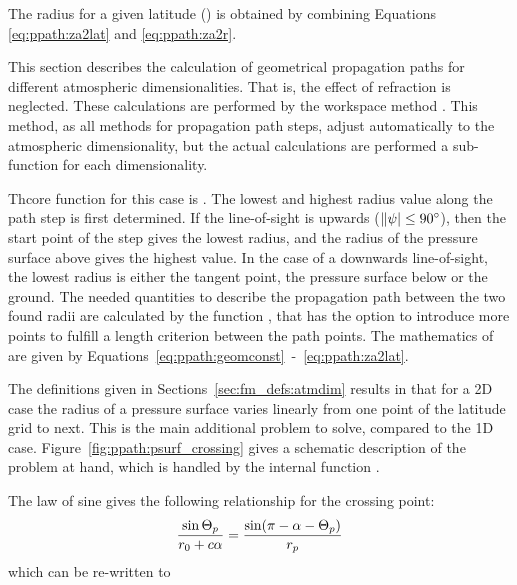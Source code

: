 The radius for a given latitude ()
is obtained by combining Equations \ref{eq:ppath:za2lat} and
\ref{eq:ppath:za2r}.



\label{sec:ppath:stepcalc}

This section describes the calculation of geometrical propagation
paths for different atmospheric dimensionalities. That is, the effect
of refraction is neglected. These calculations are performed by the
workspace method . This method, as all
methods for propagation path steps, adjust automatically to the
atmospheric dimensionality, but the actual calculations are performed
a sub-function for each dimensionality.


\label{sec:ppath:1Dgeom}

Thcore function for this case is . The
lowest and highest radius value along the path step is first
determined. If the line-of-sight is upwards ($\|\psi| \leq
90^\circ$), then the start point of the step gives the lowest radius,
and the radius of the pressure surface above gives the highest value.
In the case of a downwards line-of-sight, the lowest radius is either
the tangent point, the pressure surface below or the ground. The
needed quantities to describe the propagation path between the two
found radii are calculated by the function
, that has the option to
introduce more points to fulfill a length criterion between the path
points. The mathematics of  are
given by Equations~\ref{eq:ppath:geomconst}~-~\ref{eq:ppath:za2lat}.


\label{sec:ppath:2Dgeom}

The definitions given in Sections~\ref{sec:fm_defs:atmdim} results in
that for a 2D case the radius of a pressure surface varies linearly
from one point of the latitude grid to next. This is the main
additional problem to solve, compared to the 1D case.
Figure~\ref{fig:ppath:psurf_crossing} gives a schematic description of
the problem at hand, which is handled by the internal function
.

The law of sine gives the following relationship for the crossing
point:
\begin{equation}
  \frac{\sin\Theta_p}{r_{0}+c\alpha} = 
                                \frac{\sin(\pi-\alpha-\Theta_p)}{r_{p}}
\end{equation}
which can be re-written to

